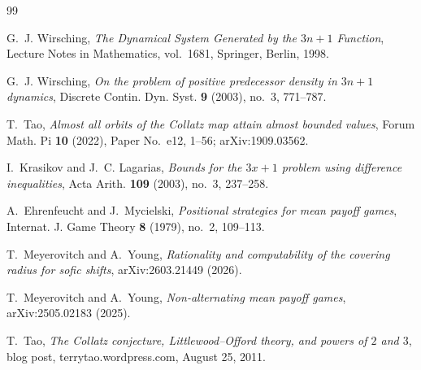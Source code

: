 \documentclass[11pt]{amsart}
\theoremstyle{plain}
\theoremstyle{definition}
\theoremstyle{remark}
\begin{document}
\begin{thebibliography}{99}

G.~J. Wirsching, \emph{The Dynamical System Generated by the $3n+1$ Function}, Lecture Notes in
Mathematics, vol.~1681, Springer, Berlin, 1998.

G.~J. Wirsching, \emph{On the problem of positive predecessor density in $3n+1$ dynamics}, Discrete
Contin. Dyn. Syst. \textbf{9} (2003), no.~3, 771--787.

T.~Tao, \emph{Almost all orbits of the Collatz map attain almost bounded values}, Forum Math. Pi
\textbf{10} (2022), Paper No.~e12, 1--56; arXiv:1909.03562.

I.~Krasikov and J.~C. Lagarias, \emph{Bounds for the $3x+1$ problem using difference inequalities},
Acta Arith. \textbf{109} (2003), no.~3, 237--258.

A.~Ehrenfeucht and J.~Mycielski, \emph{Positional strategies for mean payoff games}, Internat. J.
Game Theory \textbf{8} (1979), no.~2, 109--113.

T.~Meyerovitch and A.~Young, \emph{Rationality and computability of the covering radius for sofic
shifts}, arXiv:2603.21449 (2026).

T.~Meyerovitch and A.~Young, \emph{Non-alternating mean payoff games}, arXiv:2505.02183 (2025).

T.~Tao, \emph{The Collatz conjecture, Littlewood--Offord theory, and powers of $2$ and $3$},
blog post, terrytao.wordpress.com, August 25, 2011.

\end{thebibliography}
\end{document}
